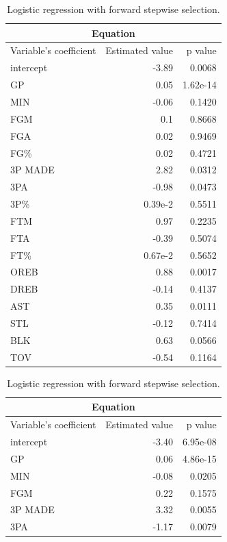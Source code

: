 \begin{table}[H]
	\begin{subtable}[h]{0.3\textwidth}
		\centering
		\begin{tabular}{|| l | r | r ||} 
			\hline
			\multicolumn{3}{|c|}{Equation} \\
			\hline
			Variable's coefficient & Estimated value & p value \\
			\hline
			intercept & -3.89 & 0.0068 \\
			GP & 0.05 & 1.62e-14 \\
			MIN & -0.06 & 0.1420 \\
			FGM & 0.1 & 0.8668 \\
			FGA & 0.02 & 0.9469 \\
			FG\% & 0.02 & 0.4721 \\
			3P MADE & 2.82 & 0.0312 \\
			3PA & -0.98 & 0.0473 \\
			3P\% & 0.39e-2 & 0.5511 \\
			FTM & 0.97 & 0.2235 \\
			FTA & -0.39 & 0.5074 \\
			FT\% & 0.67e-2 & 0.5652 \\
			OREB & 0.88 & 0.0017 \\
			DREB & -0.14 & 0.4137 \\
			AST & 0.35 & 0.0111 \\
			STL & -0.12 & 0.7414 \\
			BLK & 0.63 & 0.0566 \\				
			TOV & -0.54 & 0.1164 \\		
			\hline
		\end{tabular}
		\caption{Logistic regression with forward stepwise selection.}
		\label{table:LRFSSSum}
	\end{subtable}
	\hfill
	\begin{subtable}[h]{0.3\textwidth}
		\centering
		\begin{tabular}{|| l | r | r ||} 
			\hline
			\multicolumn{3}{|c|}{Equation} \\
			\hline
			Variable's coefficient & Estimated value & p value \\
			\hline
			intercept & -3.40 & 6.95e-08 \\
			GP & 0.06 & 4.86e-15 \\
			MIN & -0.08 & 0.0205 \\
			FGM & 0.22 & 0.1575 \\
			3P MADE & 3.32 & 0.0055 \\
			3PA & -1.17 & 0.0079 \\

\end{tabular}
\end{subtable}
\end{table}
